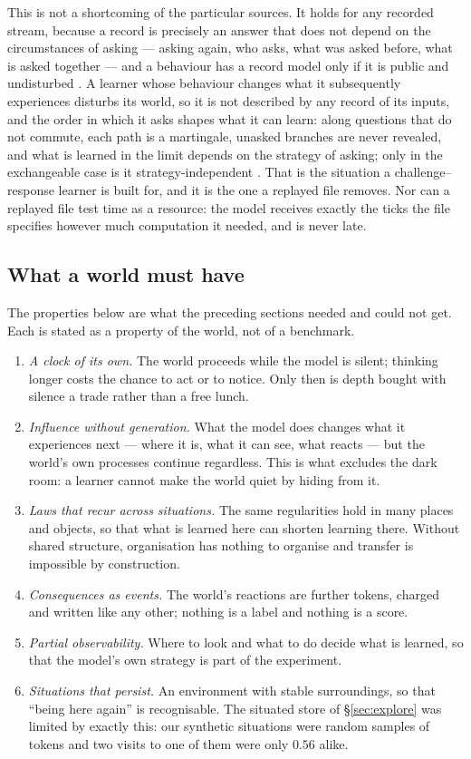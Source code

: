 \documentclass[11pt,a4paper]{article}
\theoremstyle{plain}
\theoremstyle{definition}
\theoremstyle{remark}
\begin{document}
This is not a shortcoming of the particular sources. It holds for any recorded
stream, because a record is precisely an answer that does not depend on the
circumstances of asking --- asking again, who asks, what was asked before, what
is asked together --- and a behaviour has a record model only if it is public
and undisturbed \citep{yang2026gluing}. A learner whose behaviour changes what
it subsequently experiences disturbs its world, so it is not described by any
record of its inputs, and the order in which it asks shapes what it can learn:
along questions that do not commute, each path is a martingale, unasked
branches are never revealed, and what is learned in the limit depends on the
strategy of asking; only in the exchangeable case is it
strategy-independent \citep{yang2026gluing}. That is
the situation a challenge--response learner is built for, and it is the one a
replayed file removes. Nor can a replayed file test time as a resource: the
model receives exactly the ticks the file specifies however much computation it
needed, and is never late.

\subsection{What a world must have}

The properties below are what the preceding sections needed and could not get.
Each is stated as a property of the world, not of a benchmark.
\begin{enumerate}
\item \emph{A clock of its own.} The world proceeds while the model is silent;
thinking longer costs the chance to act or to notice. Only then is depth bought
with silence a trade rather than a free lunch.
\item \emph{Influence without generation.} What the model does changes what it
experiences next --- where it is, what it can see, what reacts --- but the
world's own processes continue regardless. This is what excludes the dark room:
a learner cannot make the world quiet by hiding from it.
\item \emph{Laws that recur across situations.} The same regularities hold in
many places and objects, so that what is learned here can shorten learning
there. Without shared structure, organisation has nothing to organise and
transfer is impossible by construction.
\item \emph{Consequences as events.} The world's reactions are further tokens,
charged and written like any other; nothing is a label and nothing is a score.
\item \emph{Partial observability.} Where to look and what to do decide what is
learned, so that the model's own strategy is part of the experiment.
\item \emph{Situations that persist.} An environment with stable surroundings,
so that ``being here again'' is recognisable. The situated store of
\S\ref{sec:explore} was limited by exactly this: our synthetic situations were
random samples of tokens and two visits to one of them were only $0.56$ alike.
\end{enumerate}
\end{document}
